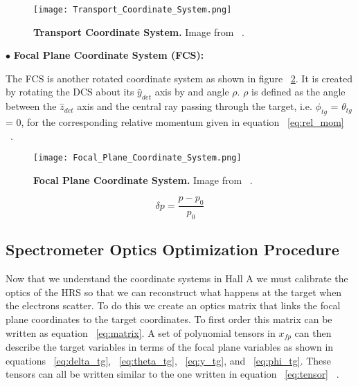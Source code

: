 \begin{figure}[!ht]
\begin{center}
\texttt{[image: Transport\_Coordinate\_System.png]}
\end{center}
\caption{
{\bf{Transport Coordinate System.}} Image from ~\cite{optics}.}
\label{fig:trcs}
\end{figure}

\noindent $\bullet$ \textbf{Focal Plane Coordinate System (FCS):}

The FCS is another rotated coordinate system as shown in figure ~\ref{fig:fcs}. It is created by rotating the DCS about its $\hat{y}_{det}$ axis by and angle $\rho$. $\rho$ is defined as the angle between the $\hat{z}_{det}$ axis and the central ray passing through the target, i.e. $\phi_{tg}$ = $\theta_{tg}$ = 0, for the corresponding relative momentum given in equation ~\ref{eq:rel_mom} ~\cite{Thesis:Ye} ~\cite{optics}.

\begin{figure}[!ht]
\begin{center}
\texttt{[image: Focal\_Plane\_Coordinate\_System.png]}
\end{center}
\caption{
{\bf{Focal Plane Coordinate System.}} Image from ~\cite{optics}.}
\label{fig:fcs}
\end{figure}

\begin{equation} \label{eq:rel_mom}
	\delta p = \frac{p-p_0}{p_0}
\end{equation}

\subsection{Spectrometer Optics Optimization Procedure}
\label{ssec:optics_optimization} 

Now that we understand the coordinate systems in Hall A we must calibrate the optics of the HRS so that we can reconstruct what happens at the target when the electrons scatter. To do this we create an optics matrix that links the focal plane coordinates to the target coordinates. To first order this matrix can be written as equation ~\ref{eq:matrix}. A set of polynomial tensors in $x_{fp}$ can then describe the target variables in terms of the focal plane variables as shown in equations ~\ref{eq:delta_tg}, ~\ref{eq:theta_tg}, ~\ref{eq:y_tg}, and ~\ref{eq:phi_tg}. These tensors can all be written similar to the one written in equation ~\ref{eq:tensor} ~\cite{optics}.

